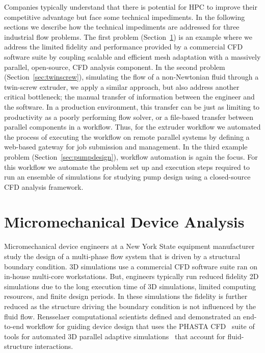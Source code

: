 Companies typically understand that there is potential for HPC to improve their
competitive advantage but face some technical impediments.
In the following sections we describe how the technical impediments are
addressed for three industrial flow problems.
The first problem (Section~\ref{sec:nozzle}) is an example where we address
the limited fidelity and performance provided by a commercial CFD software suite
by coupling scalable and efficient mesh adaptation with a massively parallel,
open-source, CFD analysis component.
In the second problem (Section~\ref{sec:twinscrew}), simulating the flow of
a non-Newtonian fluid through a twin-screw extruder, we apply a similar approach,
but also address another critical bottleneck; the manual transfer of information
between the engineer and the software.
In a production environment, this transfer can be just as limiting to
productivity as a poorly performing flow solver, or a file-based transfer
between parallel components in a workflow.
Thus, for the extruder workflow we automated the process of executing the
workflow on remote parallel systems by defining a web-based gateway for job
submission and management.
In the third example problem (Section~\ref{sec:pumpdesign}), workflow
automation is again the focus.
For this workflow we automate the problem set up and execution steps required to
run an ensemble of simulations for studying pump design using a closed-source
CFD analysis framework.

\section{Micromechanical Device Analysis}\label{sec:nozzle}

Micromechanical device engineers at a New York State equipment manufacturer
study the design of a multi-phase flow system that is driven by a structural
boundary condition.  3D simulations use a commercial CFD software suite ran on in-house
multi-core workstations.
But, engineers typically run reduced fidelity 2D simulations due to the long
execution time of 3D simulations, limited computing resources, and finite design
periods.
In these simulations the fidelity is further reduced as the structure driving
the boundary condition is not influenced by the fluid flow.
Rensselaer computational scientists defined and demonstrated an end-to-end
workflow for guiding device design that uses the PHASTA
CFD~\cite{WhiJan01,phasta_github} suite of
tools for automated 3D parallel adaptive simulations~\cite{zhou2012unstructured}
that account for fluid-structure interactions.

